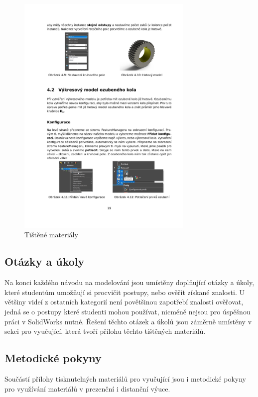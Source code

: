 \begin{figure}[htbp]
\begin{minipage}[b]{0.45\textwidth}
        \includegraphics[width=0.75\textwidth]{img/020/guide2.png}
        \caption{Tištěné materiály}
        \label{fig:thumb4}
    \end{minipage}
\end{figure}


\subsection{Otázky a úkoly}
Na konci každého návodu na modelování jsou umístěny doplňující otázky a úkoly, které studentům umožňují si procvičit postupy, nebo ověřit získané znalosti.
U většiny videí z ostatních kategorií není povětšinou zapotřebí znalosti ověřovat, jedná se o postupy které studenti mohou používat, nicméně nejsou pro úspěšnou práci v SolidWorks nutné.
Řešení těchto otázek a úkolů jsou záměrně umístěny v sekci pro vyučující, která tvoří přílohu těchto tištěných materiálů.

\subsection*{Metodické pokyny}
Součástí přílohy tisknutelných materiálů pro vyučující jsou i metodické pokyny pro využívání materiálů v prezenční i distanční výuce.

